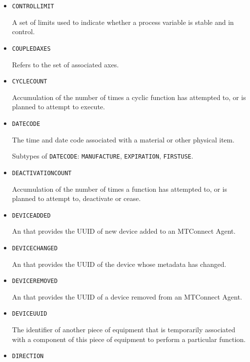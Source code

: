 \begin{itemize}
\item \texttt{CONTROL\textunderscore LIMIT}  

A set of limits used to indicate whether a process variable is stable and in control.


\item \texttt{COUPLED\textunderscore AXES}  

Refers to the set of associated axes.


\item \texttt{CYCLE\textunderscore COUNT}  

Accumulation of the number of times a cyclic function has attempted to, or is planned to attempt to execute.


\item \texttt{DATE\textunderscore CODE}  

The time and date code associated with a material or other physical item.

Subtypes of \texttt{DATE\textunderscore CODE}: \texttt{MANUFACTURE}, \texttt{EXPIRATION}, \texttt{FIRST\textunderscore USE}.

\item \texttt{DEACTIVATION\textunderscore COUNT}  

Accumulation of the number of times a function has attempted to, or is planned to attempt to, deactivate or cease.


\item \texttt{DEVICE\textunderscore ADDED}  

An  that provides the \gls{UUID} of new device added to an \gls{MTConnect Agent}.


\item \texttt{DEVICE\textunderscore CHANGED}  

An  that provides the \gls{UUID} of the device whose \gls{metadata} has changed.


\item \texttt{DEVICE\textunderscore REMOVED}  

An  that provides the \gls{UUID} of a device removed from an \gls{MTConnect Agent}.


\item \texttt{DEVICE\textunderscore UUID}  

The identifier of another piece of equipment that is temporarily associated with a component of this piece of equipment to perform a particular function.


\item \texttt{DIRECTION}  


\end{itemize}
